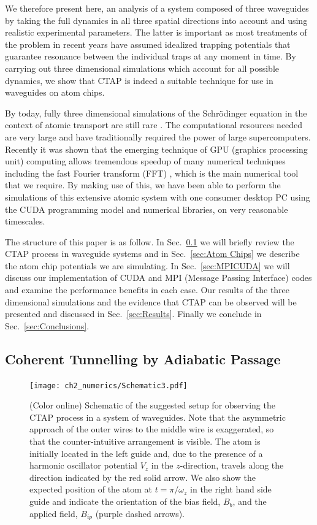We therefore present here, an analysis of a system composed of three waveguides by taking the full dynamics in all three spatial directions into account and using realistic experimental parameters. The latter is important as most treatments of the problem in recent years have assumed idealized trapping potentials that guarantee resonance between the individual traps at any moment in time. By carrying out three dimensional simulations which account for all possible dynamics, we show that CTAP is indeed a suitable technique for use in waveguides on atom chips.
 
By today, fully three dimensional simulations of the Schr\"odinger equation in the context of atomic transport are still rare \cite{Rab:08}. The computational resources needed are very large and have traditionally required the power of  large supercomputers. Recently it was shown that the emerging technique of GPU (graphics processing unit) computing allows tremendous speedup of many numerical techniques including the fast Fourier transform (FFT) \cite{Bauke:11}, which is the main numerical tool that we require. By making use of this, we have been able to perform the simulations of this extensive atomic system with one consumer desktop PC using the CUDA programming model and numerical libraries, on very reasonable timescales.

The structure of this paper is as follow. In Sec.~\ref{sec:CTAP} we will briefly review the CTAP process in waveguide systems and in Sec.~\ref{sec:Atom Chips} we describe the atom chip potentials we are simulating. In Sec.~\ref{sec:MPICUDA} we will discuss our
implementation of CUDA and MPI (Message Passing Interface) codes and examine the performance benefits in each case.  Our results of the three dimensional simulations and the evidence that CTAP can be observed will be presented and discussed in Sec.~\ref{sec:Results}. Finally we conclude in Sec.~\ref{sec:Conclusions}.

\subsection{Coherent Tunnelling by Adiabatic Passage}
\label{sec:CTAP}

\begin{figure}[tb]
  \texttt{[image: ch2\_numerics/Schematic3.pdf]}
  \caption{(Color online) Schematic of the suggested setup for observing the CTAP process in a system of waveguides. Note that the asymmetric approach of the outer wires to the middle wire is exaggerated, so that the counter-intuitive arrangement is visible. The atom is initially located in the left guide and, due to the presence of a harmonic oscillator potential $V_{z}$ in the $z$-direction, travels along the direction indicated by the red solid arrow. We also show the expected position of the atom at $t=\pi/{\omega_z}$ in the right hand side guide and indicate the orientation of the bias field, $B_b$, and the applied field, $B_{ip}$ (purple dashed arrows).}
  \label{fig:Schematic}
\end{figure}

